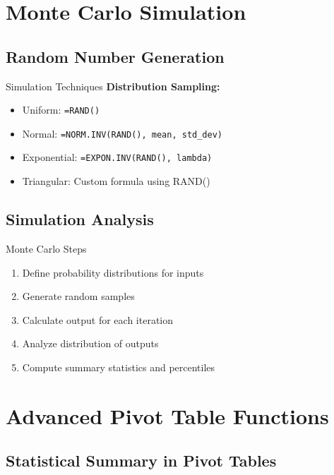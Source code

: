 \documentclass[12pt,a4paper]{book}
\begin{document}
{{\section{Monte Carlo Simulation}

\subsection{Random Number Generation}

\begin{example}{Simulation Techniques}
\textbf{Distribution Sampling:}
\begin{itemize}
    \item Uniform: \texttt{=RAND()}
    \item Normal: \texttt{=NORM.INV(RAND(), mean, std\_dev)}
    \item Exponential: \texttt{=EXPON.INV(RAND(), lambda)}
    \item Triangular: Custom formula using RAND()
\end{itemize}
\end{example}

\subsection{Simulation Analysis}

\begin{definition}{Monte Carlo Steps}
\begin{enumerate}
    \item Define probability distributions for inputs
    \item Generate random samples
    \item Calculate output for each iteration
    \item Analyze distribution of outputs
    \item Compute summary statistics and percentiles
\end{enumerate}
\end{definition}

\section{Advanced Pivot Table Functions}

\subsection{Statistical Summary in Pivot Tables}

}}
\end{document}
